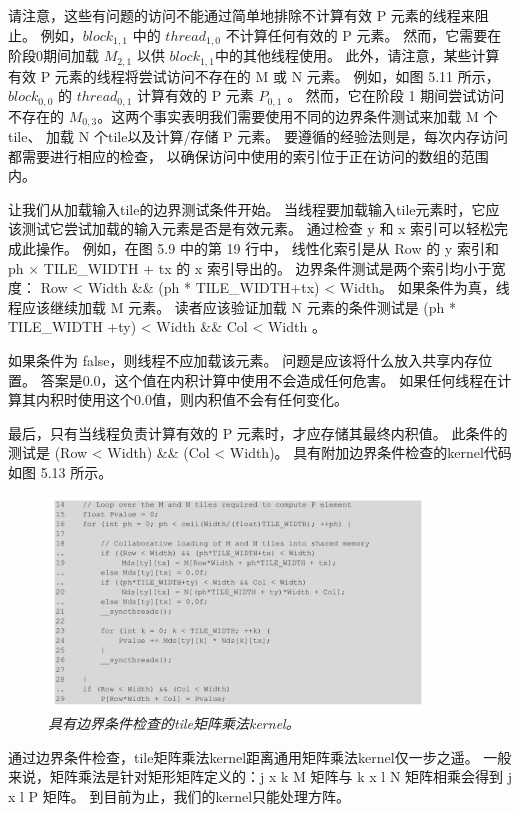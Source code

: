 请注意，这些有问题的访问不能通过简单地排除不计算有效 P 元素的线程来阻止。 
例如，$block_{1,1}$ 中的 $thread_{1,0}$ 不计算任何有效的 P 元素。 
然而，它需要在阶段0期间加载 $M_{2,1}$ 以供 $block_{1,1}$中的其他线程使用。 
此外，请注意，某些计算有效 P 元素的线程将尝试访问不存在的 M 或 N 元素。 
例如，如图 5.11 所示，$block_{0,0}$ 的 $thread_{0,1}$ 计算有效的 P 元素 $P_{0,1}$ 。 
然而，它在阶段 1 期间尝试访问不存在的 $M_{0,3}$。这两个事实表明我们需要使用不同的边界条件测试来加载 M 个tile、
加载 N 个tile以及计算/存储 P 元素。 要遵循的经验法则是，每次内存访问都需要进行相应的检查，
以确保访问中使用的索引位于正在访问的数组的范围内。

让我们从加载输入tile的边界测试条件开始。 当线程要加载输入tile元素时，它应该测试它尝试加载的输入元素是否是有效元素。 
通过检查 y 和 x 索引可以轻松完成此操作。 例如，在图 5.9 中的第 19 行中，
线性化索引是从 Row 的 y 索引和 ph × TILE\_WIDTH + tx 的 x 索引导出的。 
边界条件测试是两个索引均小于宽度： Row < Width \&\& (ph * TILE\_WIDTH+tx) < Width。 
如果条件为真，线程应该继续加载 M 元素。 
读者应该验证加载 N 元素的条件测试是 (ph * TILE\_WIDTH +ty) < Width \&\& Col < Width 。

如果条件为 false，则线程不应加载该元素。 问题是应该将什么放入共享内存位置。 
答案是0.0，这个值在内积计算中使用不会造成任何危害。 如果任何线程在计算其内积时使用这个0.0值，则内积值不会有任何变化。

最后，只有当线程负责计算有效的 P 元素时，才应存储其最终内积值。 
此条件的测试是 (Row < Width) \&\& (Col < Width)。 具有附加边界条件检查的kernel代码如图 5.13 所示。

\begin{figure}[H]
	\centering
	\includegraphics[width=0.9\textwidth]{figs/F5.13.png}
	\caption{\textit{具有边界条件检查的tile矩阵乘法kernel。}}
\end{figure}

通过边界条件检查，tile矩阵乘法kernel距离通用矩阵乘法kernel仅一步之遥。 
一般来说，矩阵乘法是针对矩形矩阵定义的：j x k M 矩阵与 k x l N 矩阵相乘会得到 j x l P 矩阵。 
到目前为止，我们的kernel只能处理方阵。

